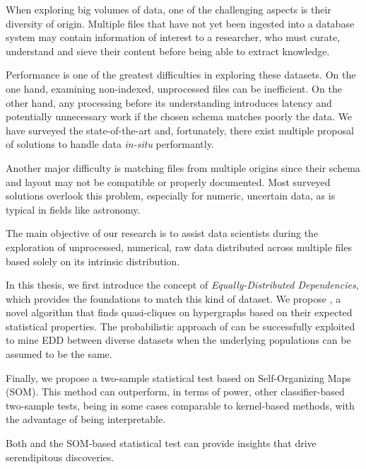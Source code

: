 {\fontsize{11}{11}\selectfont
When exploring big volumes of data, one of the challenging aspects
is their diversity of origin. Multiple files that have not yet been ingested into a
database system may contain information of interest to a researcher,
who must curate, understand and sieve their content before being able to 
extract knowledge.

Performance is one of the greatest difficulties in exploring these datasets.
On the one hand, examining non-indexed, unprocessed files can be inefficient. On the
other hand, any processing before its understanding introduces latency and
potentially unnecessary work if the chosen schema matches poorly the data.
We have surveyed the state-of-the-art and, fortunately, there exist multiple
proposal of solutions to handle data \emph{in-situ} performantly.

Another major difficulty is matching files from multiple origins since their
schema and layout may not be compatible or properly documented. Most surveyed solutions overlook this problem, especially for numeric, uncertain data, as is typical
in fields like astronomy.

The main objective of our research is to assist data scientists during the exploration of 
unprocessed, numerical, raw data distributed across multiple files based solely on its
intrinsic distribution.

In this thesis, we first introduce the concept of \emph{Equally-Distributed Dependencies}, which
provides the foundations to match this kind of dataset.
We propose \PresQ, a novel algorithm that finds quasi-cliques on hypergraphs based
on their expected statistical properties. The probabilistic approach of \PresQ can be
successfully exploited to mine EDD between diverse datasets when the underlying populations
can be assumed to be the same.

Finally, we propose a two-sample statistical test based on Self-Organizing Maps (SOM). This method
can outperform, in terms of power, other classifier-based two-sample tests, being in some cases
comparable to kernel-based methods, with the advantage of being interpretable.

Both \PresQ and the SOM-based statistical test can provide insights that drive serendipitous discoveries.
}
